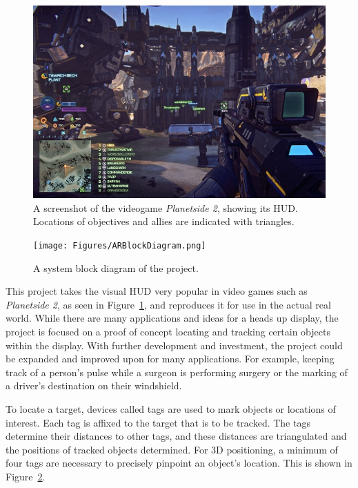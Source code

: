 \begin{figure}
	\centering
	\includegraphics[width=\linewidth]{Figures/GameHUD.jpg}
	\decoRule
	\caption{A screenshot of the videogame \emph{Planetside 2}, showing its HUD. Locations of objectives and allies are indicated with triangles.}
	\label{fig:GameHUD}
\end{figure}

\begin{figure}
	\centering
	\texttt{[image: Figures/ARBlockDiagram.png]}
	\decoRule
	\caption{A system block diagram of the project.}
	\label{fig:SystemBlockDiagram}
\end{figure}

This project takes the visual HUD very popular in video games such as \emph{Planetside 2}, as seen in Figure~\ref{fig:GameHUD}, and reproduces it for use in the actual real world.  While there are many applications and ideas for a heads up display, the project is focused on a proof of concept locating and tracking certain objects within the display. With further development and investment, the project could be expanded and improved upon for many applications. For example, keeping track of a person’s pulse while a surgeon is performing surgery or the marking of a driver's destination on their windshield.

To locate a target, devices called tags are used to mark objects or locations of interest. Each tag is affixed to the target that is to be tracked. The tags determine their distances to other tags, and these distances are triangulated and the positions of tracked objects determined. For 3D positioning, a minimum of four tags are necessary to precisely pinpoint an object's location. This is shown in Figure~\ref{fig:SystemBlockDiagram}.


